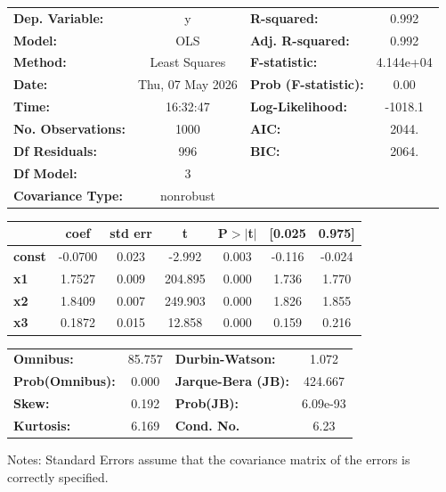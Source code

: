 \begin{center}
\begin{tabular}{lclc}
\toprule
\textbf{Dep. Variable:}    &        y         & \textbf{  R-squared:         } &     0.992   \\
\textbf{Model:}            &       OLS        & \textbf{  Adj. R-squared:    } &     0.992   \\
\textbf{Method:}           &  Least Squares   & \textbf{  F-statistic:       } & 4.144e+04   \\
\textbf{Date:}             & Thu, 07 May 2026 & \textbf{  Prob (F-statistic):} &     0.00    \\
\textbf{Time:}             &     16:32:47     & \textbf{  Log-Likelihood:    } &   -1018.1   \\
\textbf{No. Observations:} &        1000      & \textbf{  AIC:               } &     2044.   \\
\textbf{Df Residuals:}     &         996      & \textbf{  BIC:               } &     2064.   \\
\textbf{Df Model:}         &           3      & \textbf{                     } &             \\
\textbf{Covariance Type:}  &    nonrobust     & \textbf{                     } &             \\
\bottomrule
\end{tabular}
\begin{tabular}{lcccccc}
               & \textbf{coef} & \textbf{std err} & \textbf{t} & \textbf{P$> |$t$|$} & \textbf{[0.025} & \textbf{0.975]}  \\
\midrule
\textbf{const} &      -0.0700  &        0.023     &    -2.992  &         0.003        &       -0.116    &       -0.024     \\
\textbf{x1}    &       1.7527  &        0.009     &   204.895  &         0.000        &        1.736    &        1.770     \\
\textbf{x2}    &       1.8409  &        0.007     &   249.903  &         0.000        &        1.826    &        1.855     \\
\textbf{x3}    &       0.1872  &        0.015     &    12.858  &         0.000        &        0.159    &        0.216     \\
\bottomrule
\end{tabular}
\begin{tabular}{lclc}
\textbf{Omnibus:}       & 85.757 & \textbf{  Durbin-Watson:     } &    1.072  \\
\textbf{Prob(Omnibus):} &  0.000 & \textbf{  Jarque-Bera (JB):  } &  424.667  \\
\textbf{Skew:}          &  0.192 & \textbf{  Prob(JB):          } & 6.09e-93  \\
\textbf{Kurtosis:}      &  6.169 & \textbf{  Cond. No.          } &     6.23  \\
\bottomrule
\end{tabular}
\end{center}

Notes: \newline
 [1] Standard Errors assume that the covariance matrix of the errors is correctly specified.